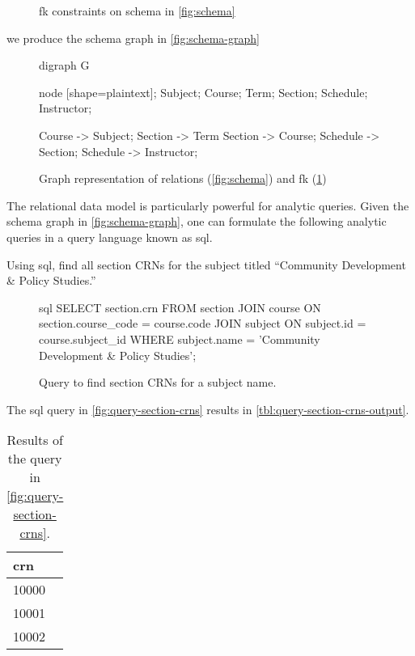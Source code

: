 \begin{ex}
\begin{figure}
				\caption{\gls{fk} constraints on schema in \vref{fig:schema}}
				\label{eqn:fk-constraints}
			\end{figure}
			
			we produce the schema graph in \vref{fig:schema-graph}
			
			\begin{figure}
				\centering
				
				\begin{dot2tex}[neato]
					digraph G {
						node [shape=plaintext]; Subject; Course; Term; Section; Schedule; Instructor;
						
						Course -> Subject;
						Section -> Term
						Section -> Course;
						Schedule -> Section;
						Schedule -> Instructor;
					}
				\end{dot2tex}
				
				\caption{Graph representation of relations (\cref{fig:schema}) and \gls{fk} (\cref{eqn:fk-constraints})}
				\label{fig:schema-graph}
			\end{figure}
		\end{ex}
		
		The relational data model is particularly powerful for analytic queries.  Given the schema graph in \vref{fig:schema-graph}, one can formulate the following analytic queries in a query language known as \gls{sql}.
			
		\begin{ex}
			Using \gls{sql}, find all section CRNs for the subject titled ``Community Development \& Policy Studies.''
			
			\begin{figure}
				\begin{singlespaced}
					\begin{pygments}{sql}
SELECT section.crn
FROM   section 
       JOIN course 
         ON section.course_code = course.code 
       JOIN subject 
         ON subject.id = course.subject_id 
WHERE  subject.name = 'Community Development & Policy Studies'; 
					\end{pygments}
				\end{singlespaced}
				
				\caption{Query to find section CRNs for a subject name.}
				\label{fig:query-section-crns}
			\end{figure}
			
			The \gls{sql} query in \vref{fig:query-section-crns} results in \vref{tbl:query-section-crns-output}.
			
			\begin{table}
				\centering
				
				\begin{tabular}{l}
					\toprule
					crn \\
					\midrule
					10000 \\
					10001 \\
					10002 \\
					\bottomrule
				\end{tabular}
				
				\caption{Results of the query in \vref{fig:query-section-crns}.}
				\label{tbl:query-section-crns-output}
			\end{table}
		\end{ex}
		
